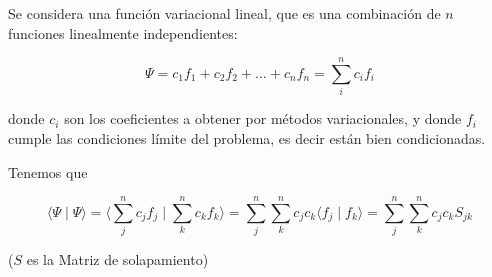 \documentclass[a4paper,openright,12pt, oneside]{book}
\newcommand{\prointerno}[2]{\langle #1 \mid #2 \rangle}
\begin{document}
Se considera una funci\'on variacional lineal, que es una combinaci\'on de $n$ funciones linealmente independientes:

\begin{displaymath}\Psi = c_{1}f_{1}+ c_{2}f_{2}+ \ldots + c_{n}f_{n}= \sum^{n}_{i}
c_{i}f_{i} \end{displaymath}

donde $c_{i}$ son los coeficientes a obtener por m\'etodos variacionales, y donde $f_{i}$ cumple las condiciones l\'imite del problema, es decir est\'an bien condicionadas.

Tenemos que

\begin{displaymath}
\prointerno{\Psi}{\Psi} = \prointerno {\sum^{n}_{j} c_{j}f_{j}}{ \sum^{n}_{k} c_{k}f_{k}} = \sum^{n}_{j} \sum^{n}_{k} c_{j} c_{k} \prointerno{f_{j}}{f_{k}} = \sum^{n}_{j} \sum^{n}_{k} c_{j} c_{k} S_{jk}
\end{displaymath}

($S$ es la Matriz de solapamiento)
\end{document}
